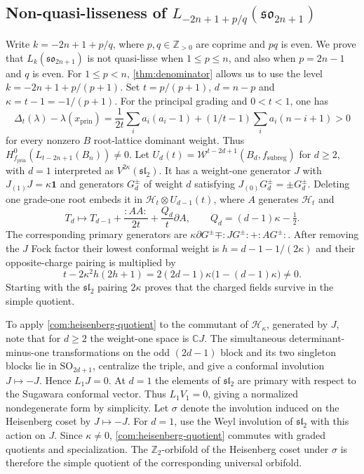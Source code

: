 \documentclass[11pt,a4paper]{amsart}
\numberwithin{equation}{section}
\theoremstyle{definition}
\theoremstyle{remark}
\newcommand{\C}{\mathbb C}
\newcommand{\Z}{\mathbb Z}
\newcommand{\sog}{\mathfrak{so}}
\newcommand{\slg}{\mathfrak{sl}}
\begin{document}
\subsection{\texorpdfstring{Non-quasi-lisseness of $L_{-2n+1+p/q}(\sog_{2n+1})$}{Non-quasi-lisseness of L(-2n+1+p/q)(so(2n+1))}}\label{seed:B-coset}
Write $k=-2n+1+p/q$, where $p,q\in\Z_{>0}$ are coprime and
$pq$ is even. We prove that $L_k(\sog_{2n+1})$ is not quasi-lisse
when $1\le p\le n$, and also when $p=2n-1$ and $q$ is even.
For $1\le p<n$, \cref{thm:denominator} allows us to use the level
$k=-2n+1+p/(p+1)$. Set $t=p/(p+1)$, $d=n-p$ and
$\kappa=t-1=-1/(p+1)$.
For the principal grading and $0<t<1$, one has
$$
 \Delta_t(\lambda)-\lambda(x_{\mathrm{prin}})
 =\frac1{2t}\sum_i a_i(a_i-1)
 +(1/t-1)\sum_i a_i(n-i+1)>0
$$
for every nonzero $B$ root-lattice dominant weight. Thus $H_{f_{\mathrm{prin}}}^0(L_{t-2n+1}(B_n))\ne0$.
Let $U_d(t)=\mathcal W^{t-2d+1}(B_d,f_{\mathrm{subreg}})$ for $d\ge2$,
with $d=1$ interpreted
as $V^{2\kappa}(\slg_2)$. It has a weight-one generator $J$
with $J_{(1)}J=\kappa\mathbf1$ and generators $G_d^\pm$ of weight $d$
satisfying $J_{(0)}G_d^\pm=\pm G_d^\pm$.
Deleting one grade-one root embeds it in
$\mathcal H_t\otimes U_{d-1}(t)$, where $A$ generates $\mathcal H_t$ and
$$
 T_d\longmapsto T_{d-1}+\frac{:AA:}{2t}
       +\frac{Q_d}{t}\partial A,\qquad Q_d=(d-1)\kappa-\tfrac12.
$$
The corresponding primary generators are
$\kappa\partial G^\pm\mp:JG^\pm:+:AG^\pm:$.
After removing the $J$ Fock factor their lowest conformal weight is
$h=d-1-1/(2\kappa)$ and their opposite-charge pairing is multiplied by
\begin{equation}\label{seed:B-norm}
 t-2\kappa^2h(2h+1)
 =2(2d-1)\kappa\bigl(1-(d-1)\kappa\bigr)\ne0.
\end{equation}
Starting with the $\slg_2$ pairing $2\kappa$ proves that the charged
fields survive in the simple quotient.

To apply \cref{com:heisenberg-quotient} to the commutant of
$\mathcal H_\kappa$, generated by $J$, note that for $d\ge2$ the
weight-one space is $\C J$.
The simultaneous determinant-minus-one transformations on the odd
$(2d-1)$ block and its two singleton blocks lie in $\mathrm{SO}_{2d+1}$,
centralize the triple, and give a conformal involution $J\mapsto-J$.
Hence $L_1J=0$. At $d=1$ the elements of $\slg_2$ are primary
with respect to the Sugawara conformal vector.
Thus $L_1V_1=0$, giving a normalized nondegenerate form by simplicity.
Let $\sigma$ denote the involution induced on the Heisenberg coset by
$J\mapsto-J$. For $d=1$, use the Weyl involution of $\slg_2$ with this
action on $J$. Since $\kappa\ne0$, \cref{com:heisenberg-quotient}
commutes with graded quotients and specialization. The
$\mathbb Z_2$-orbifold of the Heisenberg coset under $\sigma$ is
therefore the simple quotient of the corresponding universal orbifold.
\end{document}
